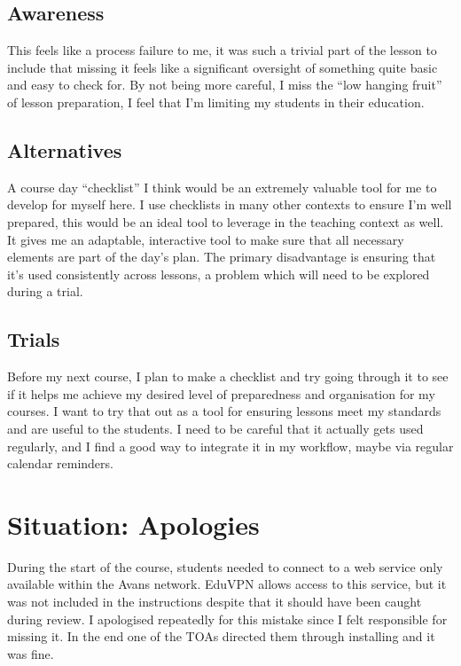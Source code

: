 \documentclass{tufte-handout}
\begin{document}
\hypertarget{awareness}{%
\subsection{Awareness}\label{awareness}}

This feels like a process failure to me, it was such a trivial part of
the lesson to include that missing it feels like a significant oversight
of something quite basic and easy to check for. By not being more
careful, I miss the ``low hanging fruit'' of lesson preparation, I feel
that I'm limiting my students in their education.

\hypertarget{alternatives}{%
\subsection{Alternatives}\label{alternatives}}

A course day ``checklist'' I think would be an extremely valuable tool
for me to develop for myself here. I use checklists in many other
contexts to ensure I'm well prepared, this would be an ideal tool to
leverage in the teaching context as well. It gives me an adaptable,
interactive tool to make sure that all necessary elements are part of
the day's plan. The primary disadvantage is ensuring that it's used
consistently across lessons, a problem which will need to be explored
during a trial.

\hypertarget{trials}{%
\subsection{Trials}\label{trials}}

Before my next course, I plan to make a checklist and try going through
it to see if it helps me achieve my desired level of preparedness and
organisation for my courses. I want to try that out as a tool for
ensuring lessons meet my standards and are useful to the students. I
need to be careful that it actually gets used regularly, and I find a
good way to integrate it in my workflow, maybe via regular calendar
reminders.

\hypertarget{situation-apologies}{%
\section{Situation: Apologies}\label{situation-apologies}}

During the start of the course, students needed to connect to a web
service only available within the Avans network. EduVPN allows access to
this service, but it was not included in the instructions despite that
it should have been caught during review. I apologised repeatedly for
this mistake since I felt responsible for missing it. In the end one of
the TOAs directed them through installing and it was fine.
\end{document}

